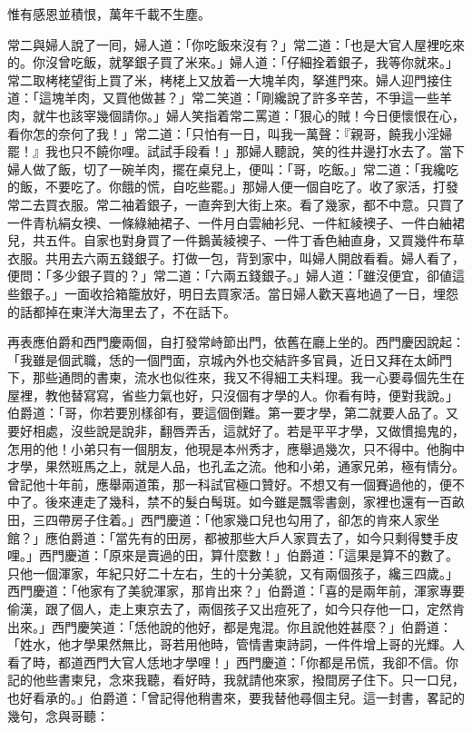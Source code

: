\begin{myquote}
惟有感恩並積恨，萬年千載不生塵。
\end{myquote}

常二與婦人說了一囘，婦人道：「你吃飯來沒有？」常二道：「也是大官人屋裡吃來的。你沒曾吃飯，就拏銀子買了米來。」婦人道：「仔細拴着銀子，我等你就來。」{}常二取栲栳望街上買了米，栲栳上又放着一大塊羊肉，拏進門來。婦人迎門接住道：「這塊羊肉，又買他做甚？」常二笑道：「剛纔說了許多辛苦，不爭這一些羊肉，就牛也該宰幾個請你。」婦人笑指着常二罵道：「狠心的賊！今日便懷恨在心，看你怎的奈何了我！」常二道：「只怕有一日，叫我一萬聲：『親哥，饒我小淫婦罷！』我也只不饒你哩。試試手段看！」{}那婦人聽說，笑的徃井邊打水去了。當下婦人做了飯，切了一碗羊肉，擺在桌兒上，便叫：「哥，吃飯。」常二道：「我纔吃的飯，不要吃了。你餓的慌，自吃些罷。」那婦人便一個自吃了。收了家活，打發常二去買衣服。常二袖着銀子，一直奔到大街上來。看了幾家，都不中意。只買了一件青杭絹女襖、一條綠紬裙子、一件月白雲紬衫兒、一件紅綾襖子、一件白紬裙兒，共五件。自家也對身買了一件鵝黃綾襖子、一件丁香色紬直身，又買幾件布草衣服。共用去六兩五錢銀子。打做一包，背到家中，叫婦人開啟看看。婦人看了，便問：「多少銀子買的？」常二道：「六兩五錢銀子。」婦人道：「雖沒便宜，卻値這些銀子。」一面收拾箱籠放好，明日去買家活。當日婦人歡天喜地過了一日，埋怨的話都掉在東洋大海里去了，不在話下。

再表應伯爵和西門慶兩個，自打發常峙節出門，依舊在廳上坐的。西門慶因說起：「我雖是個武職，恁的一個門面，京城內外也交結許多官員，近日又拜在太師門下，那些通問的書柬，流水也似徃來，我又不得細工夫料理。我一心要尋個先生在屋裡，教他替寫寫，省些力氣也好，只沒個有才學的人。你看有時，便對我說。」伯爵道：「哥，你若要別樣卻有，要這個倒難。第一要才學，第二就要人品了。又要好相處，沒些說是說非，翻唇弄舌，這就好了。若是平平才學，又做慣搗鬼的，怎用的他！小弟只有一個朋友，他現是本州秀才，應舉過幾次，只不得中。他胸中才學，果然班馬之上，就是人品，也孔孟之流。他和小弟，通家兄弟，極有情分。曾記他十年前，應舉兩道策，那一科試官極口贊好。不想又有一個賽過他的，便不中了。後來連走了幾科，禁不的髮白髩斑。如今雖是飄零書劍，家裡也還有一百畝田，三四帶房子住着。」西門慶道：「他家幾口兒也勾用了，卻怎的肯來人家坐館？」應伯爵道：「當先有的田房，都被那些大戶人家買去了，如今只剩得雙手皮哩。」{}西門慶道：「原來是賣過的田，算什麼數！」伯爵道：「這果是算不的數了。只他一個渾家，年紀只好二十左右，生的十分美貌，又有兩個孩子，纔三四歲。」西門慶道：「他家有了美貌渾家，那肯出來？」伯爵道：「喜的是兩年前，渾家專要偷漢，跟了個人，走上東京去了，兩個孩子又出痘死了，如今只存他一口，定然肯出來。」西門慶笑道：「恁他說的他好，都是鬼混。你且說他姓甚麼？」伯爵道：「姓水，他才學果然無比，哥若用他時，管情書柬詩詞，一件件增上哥的光輝。人看了時，都道西門大官人恁地才學哩！」西門慶道：「你都是吊慌，我卻不信。你記的他些書柬兒，念來我聽，看好時，我就請他來家，撥間房子住下。只一口兒，也好看承的。」伯爵道：「曾記得他稍書來，要我替他尋個主兒。這一封書，畧記的幾句，念與哥聽：

